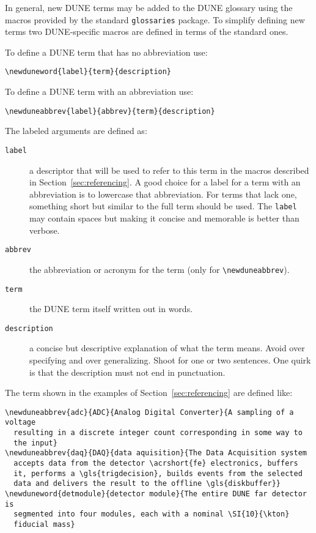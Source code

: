 \documentclass{article}
\begin{document}
In general, new DUNE terms may be added to the DUNE glossary using the
macros provided by the standard \texttt{glossaries} package. 
To simplify defining new terms two DUNE-specific macros are defined in
terms of the standard ones.

\noindent To define a DUNE term that has no abbreviation use:

\begin{verbatim}
\newduneword{label}{term}{description}
\end{verbatim}

\noindent To define a DUNE term with an abbreviation use:

\begin{verbatim}
\newduneabbrev{label}{abbrev}{term}{description}
\end{verbatim}

\noindent The labeled arguments are defined as:

\begin{description}
\item[\texttt{label}] a descriptor that will be used to refer to this
  term in the macros described in Section~\ref{sec:referencing}. 
  A good choice for a label for a term with an abbreviation is to
  lowercase that abbreviation. 
  For terms that lack one, something short but similar to the full
  term should be used. 
  The \texttt{label} may contain spaces but making it concise and
  memorable is better than verbose.
\item[\texttt{abbrev}] the abbreviation or acronym for the term (only for \verb|\newduneabbrev|).
\item[\texttt{term}] the DUNE term itself written out in words.
\item[\texttt{description}] a concise but descriptive explanation of
  what the term means. 
  Avoid over specifying and over generalizing. 
  Shoot for one or two sentences. 
  One quirk is that the description must not end in punctuation. 
\end{description}

The term shown in the examples of Section~\ref{sec:referencing} are
defined like:

\begin{verbatim}
\newduneabbrev{adc}{ADC}{Analog Digital Converter}{A sampling of a voltage
  resulting in a discrete integer count corresponding in some way to
  the input}
\newduneabbrev{daq}{DAQ}{data aquisition}{The Data Acquisition system
  accepts data from the detector \acrshort{fe} electronics, buffers
  it, performs a \gls{trigdecision}, builds events from the selected
  data and delivers the result to the offline \gls{diskbuffer}}
\newduneword{detmodule}{detector module}{The entire DUNE far detector is
  segmented into four modules, each with a nominal \SI{10}{\kton}
  fiducial mass}
\end{verbatim}
\end{document}
